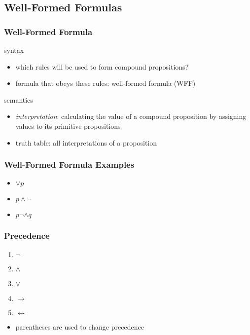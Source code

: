 \documentclass[dvipsnames]{beamer}
\begin{document}
\subsection{Well-Formed Formulas}

\begin{frame}
  \frametitle{Well-Formed Formula}

  \begin{block}{syntax}
    \begin{itemize}
      \item which rules will be used to form compound propositions?
      \item formula that obeys these rules: \alert{well-formed formula} (WFF)
    \end{itemize}
  \end{block}

  \pause
  \begin{block}{semantics}
    \begin{itemize}
      \item \emph{interpretation}: calculating the value of a compound
        proposition by assigning values to its primitive propositions
      \item truth table: all interpretations of a proposition
    \end{itemize}
  \end{block}
\end{frame}

\begin{frame}
  \frametitle{Well-Formed Formula Examples}

  \begin{example}
    \begin{itemize}
      \item $\vee p$
      \item $p \wedge \neg$
      \item $p \neg \wedge q$
    \end{itemize}
  \end{example}
\end{frame}

\begin{frame}
  \frametitle{Precedence}

  \begin{enumerate}
    \item $\neg$
    \item $\wedge$
    \item $\vee$
    \item $\rightarrow$
    \item $\leftrightarrow$
  \end{enumerate}

  \begin{itemize}
    \item parentheses are used to change precedence
  \end{itemize}
\end{frame}
\end{document}
